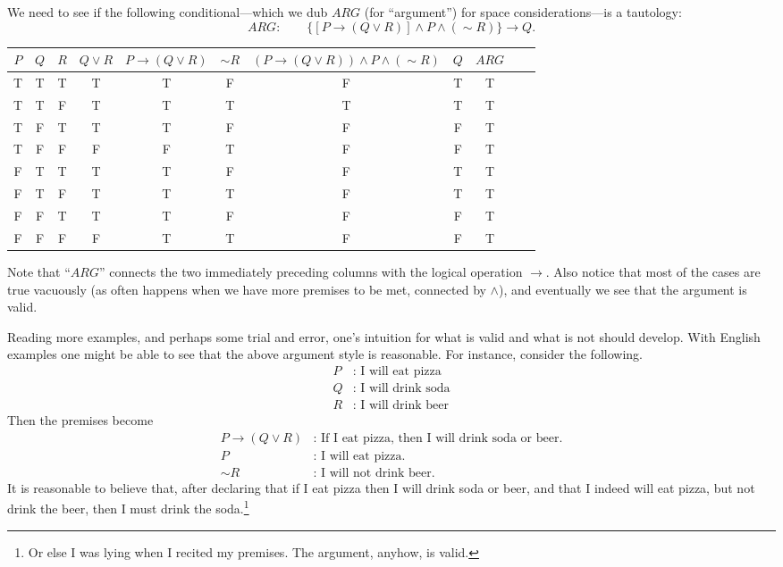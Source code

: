 We need to see if the following conditional---which we 
dub $ARG$ (for ``argument'') for space considerations---is a tautology:
$$ARG:\qquad\{[P\longrightarrow(Q\vee R)]\wedge P\wedge(\sim R)\}
       \longrightarrow Q.$$
\begin{center}
\begin{tabular}{|c|c|c||c|c|c|c|c|c|c|c|}
\hline
$P$&$Q$&$R$&$Q\vee R$&$P\rightarrow(Q\vee R)$&$\sim R$&
         $(P\rightarrow(Q\vee R))\wedge P\wedge(\sim R)$
         &$Q$&$ARG$\\
\hline
T&T&T&T&T&F&F&T&T\\
T&T&F&T&T&T&T&T&T\\
T&F&T&T&T&F&F&F&T\\
T&F&F&F&F&T&F&F&T\\
\hline
F&T&T&T&T&F&F&T&T\\
F&T&F&T&T&T&F&T&T\\
F&F&T&T&T&F&F&F&T\\
F&F&F&F&T&T&F&F&T\\
\hline
\end{tabular}
\end{center}
Note that ``$ARG$'' connects the two immediately preceding columns
with the logical operation $\longrightarrow$.  Also notice that
most of the cases are true vacuously (as often happens when
we have more premises to be met, connected by $\wedge$), 
and eventually we see that
the argument is valid.
\eex

Reading more examples, and perhaps some trial and error, 
one's intuition
for what is valid and what is not should develop.  With English
examples one might be able to see that the above argument style is
reasonable.  For instance, consider the following.
\begin{align*}
P&:\text{ I will eat pizza}\\
Q&:\text{ I will drink soda}\\
R&:\text{ I will drink beer}
\end{align*}
Then the premises become
\begin{align*}
P\longrightarrow (Q\vee R)&: \text{ If I eat pizza, then I will
                                   drink soda or beer.}\\
P&: \text{ I will eat pizza.}\\
\sim R&:\text{ I will not drink beer.}\end{align*}
It is reasonable to believe that, after declaring that if I
eat pizza then I will drink soda or beer, and that I indeed will eat 
pizza, but not drink the beer, then I must drink the soda.\footnote{
Or else I was lying when I recited my premises.  The argument, anyhow, is
valid.
}











